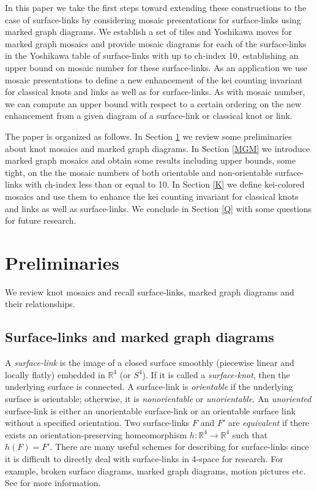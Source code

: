 \documentclass{article}
\theoremstyle{definition}
\begin{document}
In this paper we take the first steps toward extending these constructions to 
the case of surface-links by considering mosaic presentations 
for surface-links using marked graph diagrams. We establish a set of tiles 
and Yoshikawa moves
for marked graph mosaics and provide mosaic diagrams for each of the 
surface-links in the Yoshikawa table of surface-links with up to ch-index 10,
establishing an upper bound on mosaic number for these surface-links.
As an application we use
mosaic presentations to define a new enhancement of the kei counting invariant
for classical knots and links as well as for surface-links. As with mosaic 
number, we can compute an upper bound with respect to a certain
ordering on the new enhancement from a given diagram of a surface-link or
classical knot or link.

The paper is organized as follows. In Section \ref{P} we review some 
preliminaries about knot mosaics and marked graph diagrams. In Section 
\ref{MGM} we introduce marked graph mosaics and obtain some results including
upper bounds, some tight, on the the mosaic numbers of both orientable and 
non-orientable surface-links with ch-index less than or equal to 10. 
In Section \ref{K} we define kei-colored mosaics and use them to enhance the
kei counting invariant for classical knots and links as well as surface-links.
We conclude in Section \ref{Q} with some questions for future research.


\section{\large\textbf{Preliminaries}}\label{P}

We review knot mosaics and recall surface-links, marked graph diagrams and their relationships. 

\subsection{Surface-links and marked graph diagrams}

A \textit{surface-link} is the image of a closed surface smoothly (piecewise 
linear and locally flatly) embedded in $\mathbb{R}^4$ (or $S^4$). If it is 
called a \textit{surface-knot}, then the underlying surface is connected. 
A surface-link is \textit{orientable} if the underlying surface is orientable; 
otherwise, it is \textit{nonorientable} or \textit{unorientable}. 
An \textit{unoriented} surface-link is either an unorientable surface-link or
an orientable surface link without a specified orientation.
Two surface-links $F$ and $F'$ are \textit{equivalent} if there exists an 
orientation-preserving homeomorphism 
$h : \mathbb{R}^4 \rightarrow \mathbb{R}^4$ such that $h(F)=F'$.
There are many useful schemes for describing for surface-links since it is 
difficult to directly deal with surface-links in 4-space for research. For 
example, broken surface diagrams, marked graph diagrams, motion pictures etc. 
See \cite{CarterKamadaSaito,Kamadabook,Kamadabook2,Yoshikawa} for more 
information. %
\end{document}
